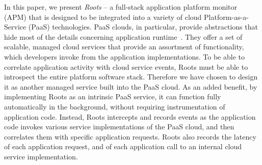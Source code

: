 In this paper, we present \textit{Roots} --  
a full-stack application platform 
monitor (APM) that is designed to be integrated
into a variety of cloud Platform-as-a-Service (PaaS) technologies. 
PaaS clouds, in particular, provide abstractions that hide most of the 
details concerning application
runtime~\cite{Soni:2014:CCB:2592737.2592741}. 
They offer a set of scalable, managed cloud services that
provide an assortment of functionality,
which developers invoke from the application implementations.
To be able to correlate application activity with cloud service events,
Roots must be able to introspect the entire platform software stack. Therefore we
have chosen to design it
as another managed service built into the PaaS cloud. 
As an added benefit, by implementing Roots as an intrinsic PaaS service,
it can function fully automatically in the background, without
requiring instrumentation of application code. Instead,
Roots intercepts and records events as the
application code invokes various service implementations of the PaaS cloud,
and then correlates them with specific application requests.
Roots also records the latency of each application request, and
of each application call to an
internal cloud service implementation. %

